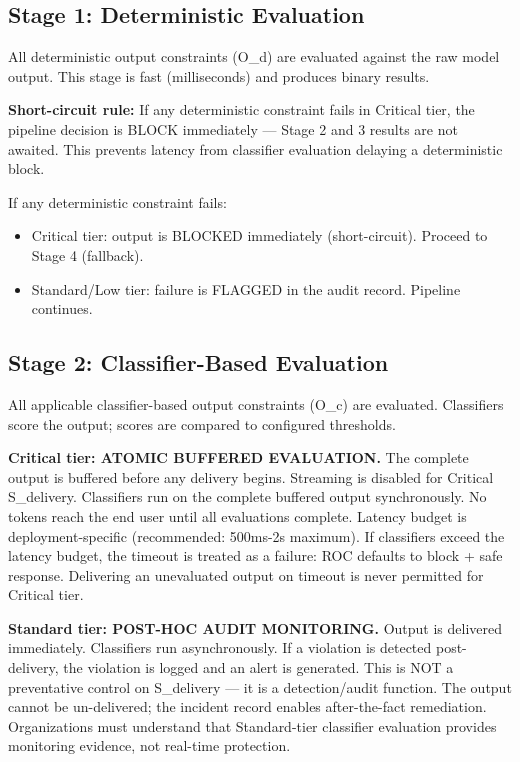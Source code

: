 \subsection{Stage 1: Deterministic Evaluation}


All deterministic output constraints (O\_\allowbreak{}d) are evaluated against the raw model output. This stage is fast (milliseconds) and produces binary results.

\textbf{Short-circuit rule:} If any deterministic constraint fails in Critical tier, the pipeline decision is BLOCK immediately --- Stage 2 and 3 results are not awaited. This prevents latency from classifier evaluation delaying a deterministic block.

If any deterministic constraint fails:

\begin{itemize}
  \item Critical tier: output is BLOCKED immediately (short-circuit). Proceed to Stage 4 (fallback).
  \item Standard/Low tier: failure is FLAGGED in the audit record. Pipeline continues.
\end{itemize}


\subsection{Stage 2: Classifier-Based Evaluation}


All applicable classifier-based output constraints (O\_\allowbreak{}c) are evaluated. Classifiers score the output; scores are compared to configured thresholds.

\textbf{Critical tier: ATOMIC BUFFERED EVALUATION.} The complete output is buffered before any delivery begins. Streaming is disabled for Critical S\_\allowbreak{}delivery. Classifiers run on the complete buffered output synchronously. No tokens reach the end user until all evaluations complete. Latency budget is deployment-specific (recommended: 500ms-2s maximum). If classifiers exceed the latency budget, the timeout is treated as a failure: ROC defaults to block + safe response. Delivering an unevaluated output on timeout is never permitted for Critical tier.

\textbf{Standard tier: POST-HOC AUDIT MONITORING.} Output is delivered immediately. Classifiers run asynchronously. If a violation is detected post-delivery, the violation is logged and an alert is generated. This is NOT a preventative control on S\_\allowbreak{}delivery --- it is a detection/audit function. The output cannot be un-delivered; the incident record enables after-the-fact remediation. Organizations must understand that Standard-tier classifier evaluation provides monitoring evidence, not real-time protection.

